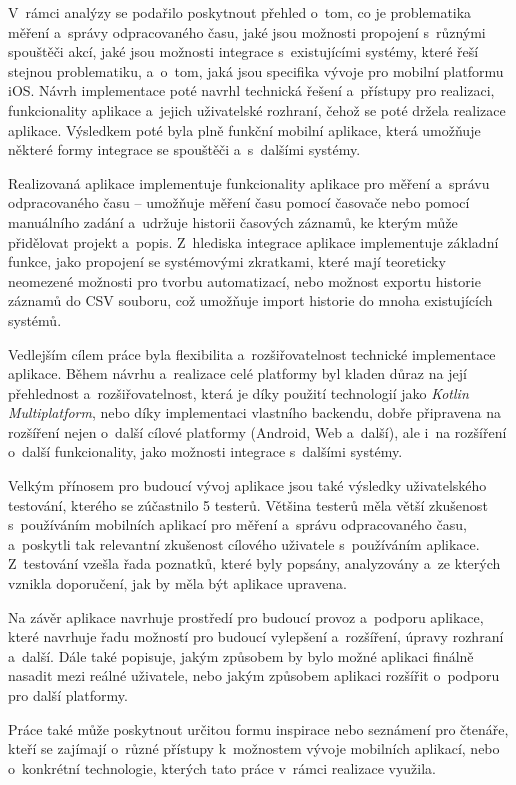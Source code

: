 V~rámci analýzy se podařilo poskytnout přehled o~tom, co je problematika měření a~správy odpracovaného času, jaké jsou možnosti propojení s~různými spouštěči akcí, jaké jsou možnosti integrace s~existujícími systémy, které řeší stejnou problematiku, a~o~tom, jaká jsou specifika vývoje pro mobilní platformu iOS. Návrh implementace poté navrhl technická řešení a~přístupy pro realizaci, funkcionality aplikace a~jejich uživatelské rozhraní, čehož se poté držela realizace aplikace. Výsledkem poté byla plně funkční mobilní aplikace, která umožňuje některé formy integrace se spouštěči a~s~dalšími systémy.

Realizovaná aplikace implementuje funkcionality aplikace pro měření a~správu odpracovaného času – umožňuje měření času pomocí časovače nebo pomocí manuálního zadání a~udržuje historii časových záznamů, ke kterým může přidělovat projekt a~popis. Z~hlediska integrace aplikace implementuje základní funkce, jako propojení se systémovými zkratkami, které mají teoreticky neomezené možnosti pro tvorbu automatizací, nebo možnost exportu historie záznamů do CSV souboru, což umožňuje import historie do mnoha existujících systémů.

Vedlejším cílem práce byla flexibilita a~rozšiřovatelnost technické implementace aplikace. Během návrhu a~realizace celé platformy byl kladen důraz na její přehlednost a~rozšiřovatelnost, která je díky použití technologií jako \emph{Kotlin Multiplatform}, nebo díky implementaci vlastního backendu, dobře připravena na rozšíření nejen o~další cílové platformy (Android, Web a~další), ale i~na rozšíření o~další funkcionality, jako možnosti integrace s~dalšími systémy.

Velkým přínosem pro budoucí vývoj aplikace jsou také výsledky uživatelského testování, kterého se zúčastnilo 5 testerů. Většina testerů měla větší zkušenost s~používáním mobilních aplikací pro měření a~správu odpracovaného času, a~poskytli tak relevantní zkušenost cílového uživatele s~používáním aplikace. Z~testování vzešla řada poznatků, které byly popsány, analyzovány a~ze kterých vznikla doporučení, jak by měla být aplikace upravena.

Na závěr aplikace navrhuje prostředí pro budoucí provoz a~podporu aplikace, které navrhuje řadu možností pro budoucí vylepšení a~rozšíření, úpravy rozhraní a~další. Dále také popisuje, jakým způsobem by bylo možné aplikaci finálně nasadit mezi reálné uživatele, nebo jakým způsobem aplikaci rozšířit o~podporu pro další platformy.

Práce také může poskytnout určitou formu inspirace nebo seznámení pro čtenáře, kteří se zajímají o~různé přístupy k~možnostem vývoje mobilních aplikací, nebo o~konkrétní technologie, kterých tato práce v~rámci realizace využila.



































